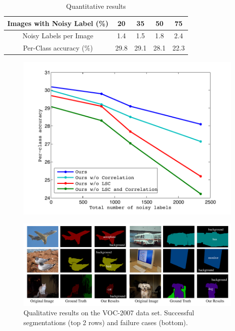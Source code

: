 \begin{table}[ht]
\begin{center}
\begin{tabular}{|c|c|c|c|c|}
\hline
Images with Noisy Label (\%) & 20 & 35 & 50 & 75 \\
\hline
Noisy Labels per Image & 1.4 & 1.5 & 1.8 & 2.4 \\
\hline
Per-Class accuracy (\%) & 29.8 & 29.1 & 28.1 & 22.3 \\
\hline
\end{tabular}
\end{center}
\caption{Quantitative results  }
\label{tab:ExpNoise}
\end{table}


\begin{figure}[ht]
\begin{center}
    \includegraphics[width=1\linewidth]{fig_noisylabel.pdf}
\end{center}
\vspace{-3mm}
\caption{}
\label{fig:noisyexp}
\end{figure}


\begin{figure}
\begin{center}
    \includegraphics[width=1\linewidth]{Fig_VOC.pdf}
\end{center}
\vspace{-3mm}
\caption{Qualitative results on the VOC-2007 data set. Successful segmentations (top 2 rows) and failure cases (bottom).}
\label{fig:VOC-2007}
\end{figure}

